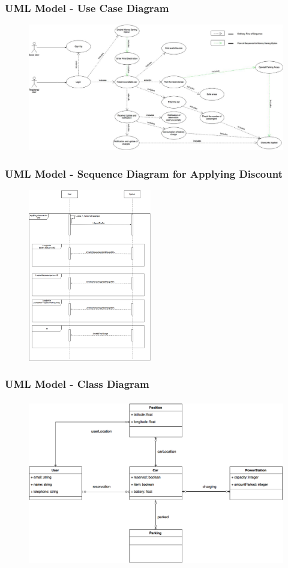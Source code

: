 \begin{frame}
	\frametitle{UML Model - Use Case Diagram}
	\begin{figure}[H]
		\centering
		\includegraphics[width=\linewidth,keepaspectratio]{figures/use_case_diagram.eps}
		\label{fig:use_case_diagram}
	\end{figure}
\end{frame}

\begin{frame}
	\frametitle{UML Model - Sequence Diagram for Applying Discount}
	\begin{figure}[H]
		\centering
		\includegraphics[height=7.5cm,keepaspectratio]{figures/sequence_discounts.eps}
		\label{fig:sequence_discounts}
	\end{figure}
\end{frame}

\begin{frame}
	\frametitle{UML Model - Class Diagram}
	\begin{figure}[H]
		\centering
		\includegraphics[height=7.3cm,keepaspectratio]{figures/class_diagram.eps}
		\label{fig:class_diagram}
	\end{figure}
\end{frame}


